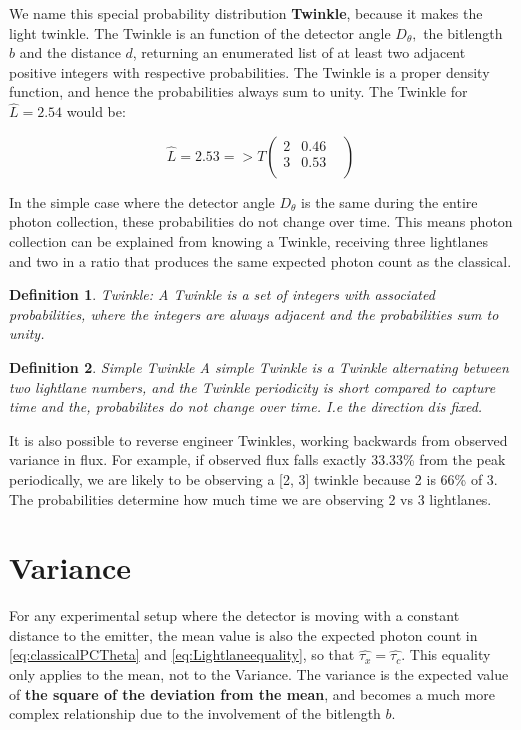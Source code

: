 \documentclass[notitlepage]{article}
\newtheorem{definition}{Definition}[section]
\begin{document}
We name this special probability distribution \textbf{Twinkle}, because it makes the light twinkle. The Twinkle is an function of the detector angle $D_\theta,$ the bitlength $b$ and the distance $d$, returning an enumerated list of at least two adjacent positive integers with respective probabilities. The Twinkle is a proper density function, and hence the probabilities always sum to unity. The Twinkle for $\hat{L} = 2.54$ would be:

\begin{equation*}
\hat{L} = 2.53 =>  T
\begin{pmatrix}
2 & 0.46 &  \\
3 & 0.53 \\
\end{pmatrix}
\label{Twinkle254}
\end{equation*}

In the simple case where the detector angle $ D_\theta $ is the same during the entire photon collection, these probabilities do not change over time. This means photon collection can be explained from knowing a Twinkle, receiving three lightlanes and two in a ratio that produces the same expected photon count as the classical.

\begin{definition}{\large Twinkle:}
A Twinkle is a set of integers with associated probabilities, where the integers are always adjacent and the probabilities sum to unity.
\end{definition}

\begin{definition}{\large Simple Twinkle} 
A simple Twinkle is a Twinkle alternating between two lightlane numbers, and the Twinkle periodicity is short compared to capture time and the, probabilites do not change over time. I.e the direction $d$is fixed.
\end{definition}

It is also possible to reverse engineer Twinkles, working backwards from observed variance in flux. For example, if observed flux falls exactly 33.33\% from the peak periodically, we are likely to be observing a [2, 3] twinkle because 2 is 66\% of 3. The probabilities determine how much time we are observing 2 vs 3 lightlanes.

\section{Variance}
For any experimental setup where the detector is moving with a constant distance to the emitter, the mean value is also the expected photon count in \eqref{eq:classicalPCTheta} and \eqref{eq:Lightlaneequality}, so that  $\hat{\tau_x} = \hat{\tau_c}$. This equality only applies to the mean, not to the Variance. The variance  is  the expected value of \textbf{the square of the deviation from the mean}, and becomes a much more complex relationship due to the involvement of the bitlength $b$.
\end{document}

